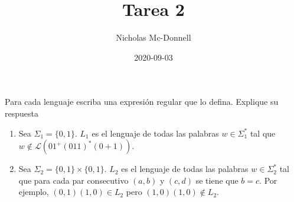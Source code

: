 \documentclass{homework}
\title{Tarea 2}
\date{2020-09-03}
\author{Nicholas Mc-Donnell}
\begin{document}
\maketitle
\newpage
{}
\begin{p1}
    \begin{prob}
        Para cada lenguaje escriba una expresión regular que lo defina. Explique su respuesta
        \begin{enumerate}
            \item Sea \(\Sigma_1=\{0,1\}\). \(L_1\) es el lenguaje de todas las palabras \(w\in\Sigma_1^*\) tal que \(w\notin\mathcal{L}(01^+(011)^*(0+1))\).
            \item Sea \(\Sigma_2=\{0,1\}\times\{0,1\}\). \(L_2\) es el lenguaje de todas las palabras \(w\in\Sigma_2^*\) tal que para cada par consecutivo \((a,b)\) y \((c,d)\) se tiene que \(b=c\). Por ejemplo, \((0,1)(1,0)\in L_2\) pero \((1,0)(1,0)\notin L_2\).
        \end{enumerate}
    \end{prob}


\end{p1}
\end{document}
